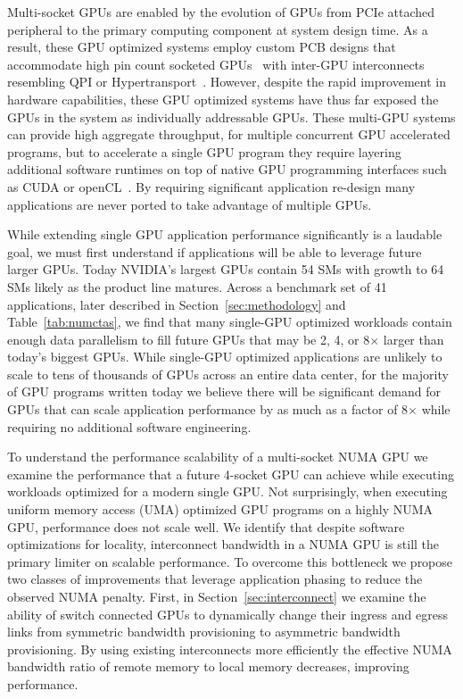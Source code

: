 Multi-socket GPUs are enabled by the evolution of GPUs from PCIe attached 
peripheral to the primary computing component at system design time.  As a 
result, these GPU optimized systems employ custom PCB designs that accommodate 
high pin count socketed GPUs~\cite{dgx} with inter-GPU interconnects resembling 
QPI or Hypertransport~\cite{NVLINK,INTELQPI,AMDHT}.  However, despite the rapid 
improvement in hardware capabilities, these GPU optimized systems have 
thus far exposed the GPUs in the system as individually addressable GPUs. These
multi-GPU systems can provide high aggregate throughput, for multiple concurrent
GPU accelerated programs, but to accelerate a single GPU program they
require layering additional software runtimes on top of native GPU programming 
interfaces such as CUDA or openCL~\cite{CUDA,OPENCL}. By requiring significant
application re-design many applications are never ported to take advantage
of multiple GPUs.

While extending single GPU application performance significantly is a 
laudable goal, we must first understand if applications will be able to 
leverage future larger GPUs.  Today NVIDIA's largest GPUs contain 54 SMs with 
growth to 64 SMs likely as the product line matures. Across a benchmark set 
of 41 applications, later described in Section~\ref{sec:methodology} and 
Table~\ref{tab:numctas}, we find that many single-GPU optimized workloads 
contain enough data parallelism to fill future GPUs that may be 2, 4, or 
8$\times$ larger than today's biggest GPUs.  While single-GPU optimized 
applications are unlikely to scale to tens of thousands of GPUs across an 
entire data center, for the majority of GPU programs written today we believe 
there will be significant demand for GPUs that can scale application 
performance by as much as a factor of 8$\times$ while requiring no additional 
software engineering.

To understand the performance scalability of a multi-socket NUMA GPU we examine 
the performance that a future 4-socket GPU can achieve while executing 
workloads optimized for a modern single GPU. Not surprisingly, when executing 
uniform memory access (UMA) optimized GPU programs on a highly NUMA GPU, 
performance does not scale well.  We identify that despite software 
optimizations for locality, interconnect bandwidth in a NUMA GPU is still the 
primary limiter on scalable performance.  To overcome this bottleneck we propose 
two classes of improvements that leverage application phasing to reduce the 
observed NUMA penalty.  First, in Section~\ref{sec:interconnect} we examine the 
ability of switch connected GPUs to dynamically change their ingress and egress 
links from symmetric bandwidth provisioning to asymmetric bandwidth 
provisioning.  By using existing interconnects more efficiently the effective 
NUMA bandwidth ratio of remote memory to local memory decreases, improving 
performance.


